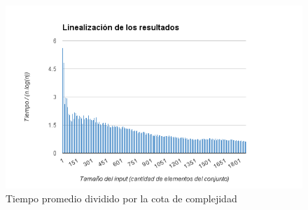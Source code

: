  \begin{figure}[h!]
   \begin{center}
 	\includegraphics[scale=0.8]{imagenes/ej2/linealizacion.png}
	\caption{Tiempo promedio dividido por la cota de complejidad}
	\label{estacionesRel}
   \end{center}
 \end{figure}

